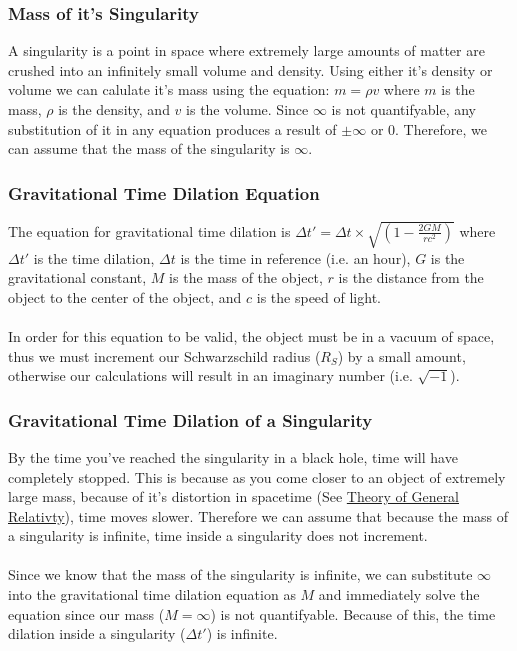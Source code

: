 \documentclass{article}
\begin{document}
\subsubsection{Mass of it's Singularity}
A singularity is a point in space where extremely large amounts of matter are crushed into an infinitely small volume and density. Using either it's density or volume we can calulate it's mass using the equation: $m = \rho v$ where $m$ is the mass, $\rho$ is the density, and $v$ is the volume. Since $\infty$ is not quantifyable, any substitution of it in any equation produces a result of $\pm \infty$ or 0. Therefore, we can assume that the mass of the singularity is $\infty$.

\subsubsection{Gravitational Time Dilation Equation}
The equation for gravitational time dilation is $\Delta t\prime = \Delta t\times\sqrt{(1-\frac{2GM}{rc^2})}$ where $\Delta t\prime$ is the time dilation, $\Delta t$ is the time in reference (i.e. an hour), $G$ is the gravitational constant, $M$ is the mass of the object, $r$ is the distance from the object to the center of the object, and $c$ is the speed of light.\\\\
In order for this equation to be valid, the object must be in a vacuum of space, thus we must increment our Schwarzschild radius ($R_{S}$) by a small amount, otherwise our calculations will result in an imaginary number (i.e. $\sqrt{-1}$).

\subsubsection{Gravitational Time Dilation of a Singularity}
By the time you've reached the singularity in a black hole, time will have completely stopped. This is because as you come closer to an object of extremely large mass, because of it's distortion in spacetime (See \hyperref[sec:generalrelativity]{Theory of General Relativty}), time moves slower. Therefore we can assume that because the mass of a singularity is infinite, time inside a singularity does not increment. \\\\
Since we know that the mass of the singularity is infinite, we can substitute $\infty$ into the gravitational time dilation equation as $M$ and immediately solve the equation since our mass ($M = \infty$) is not quantifyable. Because of this, the time dilation inside a singularity ($\Delta t\prime$) is infinite.
\end{document}
